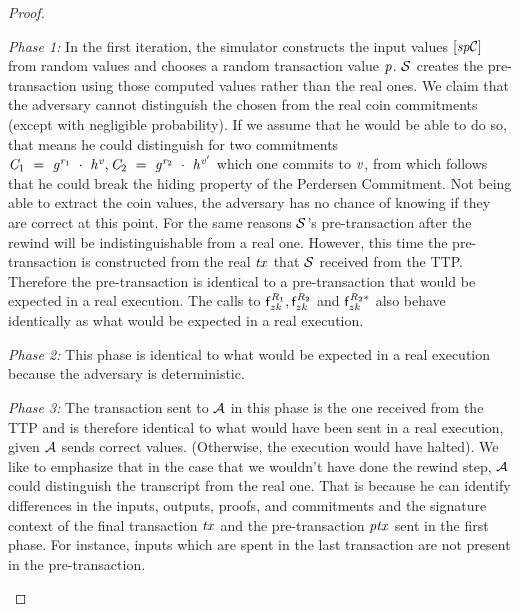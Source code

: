 \begin{proof}
    \begin{asparaitem}
        \item \textit{Phase 1:} In the first iteration, the simulator constructs the input values $[\mathit{sp}\mathcal{C}]$ from random values and chooses a random transaction value $\mathit{p}$.
        $\mathcal{S}$ creates the pre-transaction using those computed values rather than the real ones.
        We claim that the adversary cannot distinguish the chosen from the real coin commitments (except with negligible probability).
        If we assume that he would be able to do so, that means he could distinguish for two commitments $\mathit{C}_1 ~=~ \mathit{g}^{\mathit{r}_1} ~\cdot~ \mathit{h}^{\mathit{v}}, \mathit{C}_2 ~=~ \mathit{g}^{\mathit{r}_2} ~\cdot~ \mathit{h}^{{\mathit{v}}'}$ which one commits to $\mathit{v}$, from which follows that he could break the hiding property of the Perdersen Commitment.
        Not being able to extract the coin values, the adversary has no chance of knowing if they are correct at this point.
        For the same reasons $\mathcal{S}$'s pre-transaction after the rewind will be indistinguishable from a real one.
        However, this time the pre-transaction is constructed from the real $\mathit{tx}$ that $\mathcal{S}$ received from the TTP.
        Therefore the pre-transaction is identical to a pre-transaction that would be expected in a real execution.
        The calls to $\mathsf{f}^{\mathit{R}_1}_{zk}, \mathsf{f}^{\mathit{R}_2}_{zk}$ and $\mathsf{f}^{\mathit{R}_2*}_{zk}$ also behave identically as what would be expected in a real execution.
        \item \textit{Phase 2:} This phase is identical to what would be expected in a real execution because the adversary is deterministic.
        \item \textit{Phase 3:} The transaction sent to $\mathcal{A}$ in this phase is the one received from the TTP and is therefore identical to what would have been sent in a real execution, given $\mathcal{A}$ sends correct values. (Otherwise, the execution would have halted).
        We like to emphasize that in the case that we wouldn't have done the rewind step, $\mathcal{A}$ could distinguish the transcript from the real one.
        That is because he can identify differences in the inputs, outputs, proofs, and commitments and the signature context of the final transaction $\mathit{tx}$ and the pre-transaction $\mathit{ptx}$ sent in the first phase.
        For instance, inputs which are spent in the last transaction are not present in the pre-transaction.

\end{asparaitem}
\end{proof}
